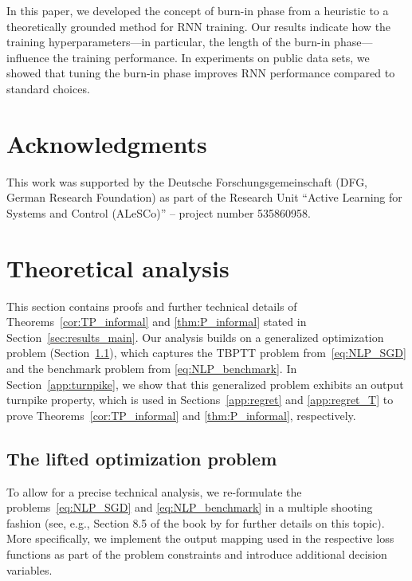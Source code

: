 \documentclass{article} %
\begin{document}
In this paper, we developed the concept of burn-in phase from a heuristic to a theoretically grounded method for RNN training.
Our results indicate how the training hyperparameters---in particular, the length of the burn-in phase---influence the training performance. In experiments on public data sets, we showed that tuning the burn-in phase improves RNN performance compared to standard choices. 

\section*{Acknowledgments}
This work was supported by the Deutsche Forschungsgemeinschaft (DFG, German Research Foundation) as part of the Research Unit ``Active Learning for Systems and Control (ALeSCo)'' -- project number 535860958.



\appendix

\section{Theoretical analysis}\label{appendix}

This section contains proofs and further technical details of Theorems~\ref{cor:TP_informal} and \ref{thm:P_informal} stated in Section~\ref{sec:results_main}. Our analysis builds on a generalized optimization problem (Section~\ref{app:optim}), which captures the TBPTT problem from~\eqref{eq:NLP_SGD} and the benchmark problem from \eqref{eq:NLP_benchmark}. In Section~\ref{app:turnpike}, we show that this generalized problem exhibits an output turnpike property, which is used in Sections~\ref{app:regret} and \ref{app:regret_T} to prove Theorems~\ref{cor:TP_informal} and \ref{thm:P_informal}, respectively.

\subsection{The lifted optimization problem}\label{app:optim}

To allow for a precise technical analysis, we re-formulate the problems~\eqref{eq:NLP_SGD} and \eqref{eq:NLP_benchmark} in a multiple shooting fashion (see, e.g., Section 8.5 of the book by \citet{Rawlings2017} for further details on this topic).
More specifically, we implement the output mapping used in the respective loss functions as part of the problem constraints and introduce additional decision variables.
\end{document}

